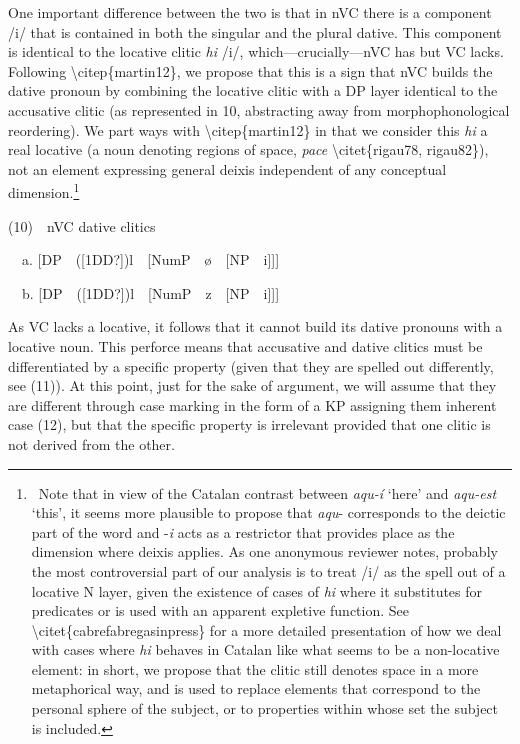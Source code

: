 \documentclass[12pt]{article}
\newenvironment{styleStandard}{\setlength\leftskip{0cm}\setlength\rightskip{0cm}\setlength\parindent{0cm}\setlength\parfillskip{0pt plus 1fil}\setlength\parskip{0in plus 1pt}\writerlistparindent\writerlistleftskip\leavevmode\normalfont\normalsize\writerlistlabel\ignorespaces}{\unskip\vspace{0.111in plus 0.0111in}\par}
\newcommand\writerlistleftskip{}
\newcommand\writerlistparindent{}
\newcommand\writerlistlabel{}
\begin{document}
\begin{styleStandard}
One important difference between the two is that in nVC there is a component /i/ that is contained in both the singular and the plural dative. This component is identical to the locative clitic \textit{hi }/i/, which—crucially—nVC has but VC lacks. Following {\textbackslash}citep\{martin12\}, we propose that this is a sign that nVC builds the dative pronoun by combining the locative clitic with a DP layer identical to the accusative clitic (as represented in 10, abstracting away from morphophonological reordering). We part ways with {\textbackslash}citep\{martin12\} in that we consider this \textit{hi }a real locative (a noun denoting regions of space, \textit{pace} {\textbackslash}citet\{rigau78, rigau82\}), not an element expressing general deixis independent of any conceptual dimension.\footnote{\ Note that in view of the Catalan contrast between \textit{aqu-í} ‘here’ and \textit{aqu-est} ‘this’, it seems more plausible to propose that \textit{aqu}{}- corresponds to the deictic part of the word and -\textit{i} acts as a restrictor that provides place as the dimension where deixis applies. As one anonymous reviewer notes, probably the most controversial part of our analysis is to treat /i/ as the spell out of a locative N layer, given the existence of cases of \textit{hi} where it substitutes for predicates or is used with an apparent expletive function. See {\textbackslash}citet\{cabrefabregasinpress\} for a more detailed presentation of how we deal with cases where \textit{hi} behaves in Catalan like what seems to be a non-locative element: in short, we propose that the clitic still denotes space in a more metaphorical way, and is used to replace elements that correspond to the personal sphere of the subject, or to properties within whose set the subject is included.} 
\end{styleStandard}

\begin{styleStandard}
(10)\ \ nVC dative clitics
\end{styleStandard}

\begin{styleStandard}
\ \ a. [DP\ \ ([1DD?])l\ \ [NumP\ \ ø\ \ [NP\ \ i]]]
\end{styleStandard}

\begin{styleStandard}
\ \ b. [DP\ \ ([1DD?])l\ \ [NumP\ \ z\ \ [NP\ \ i]]]
\end{styleStandard}

\begin{styleStandard}
As VC lacks a locative, it follows that it cannot build its dative pronouns with a locative noun. This perforce means that accusative and dative clitics must be differentiated by a specific property (given that they are spelled out differently, see (11)). At this point, just for the sake of argument, we will assume that they are different through case marking in the form of a KP assigning them inherent case (12), but that the specific property is irrelevant provided that one clitic is not derived from the other.
\end{styleStandard}
\end{document}

